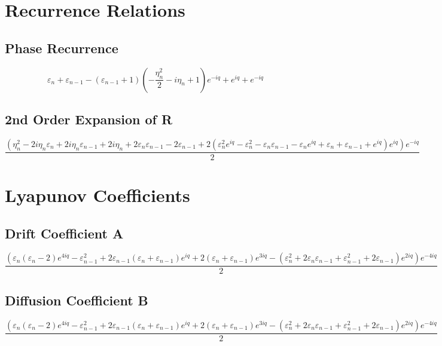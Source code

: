 
\section{Recurrence Relations}

\subsection{Phase Recurrence}
\begin{equation}
    \varepsilon_{n} + \varepsilon_{n-1} - \left(\varepsilon_{n-1} + 1\right) \left(- \frac{\eta_{n}^{2}}{2} - i \eta_{n} + 1\right) e^{- i q} + e^{i q} + e^{- i q}
    \label{eq:recurrence_r_ref}
\end{equation}

\subsection{2nd Order Expansion of R}
\begin{equation}
    \frac{\left(\eta_{n}^{2} - 2 i \eta_{n} \varepsilon_{n} + 2 i \eta_{n} \varepsilon_{n-1} + 2 i \eta_{n} + 2 \varepsilon_{n} \varepsilon_{n-1} - 2 \varepsilon_{n-1} + 2 \left(\varepsilon_{n}^{2} e^{i q} - \varepsilon_{n}^{2} - \varepsilon_{n} \varepsilon_{n-1} - \varepsilon_{n} e^{i q} + \varepsilon_{n} + \varepsilon_{n-1} + e^{i q}\right) e^{i q}\right) e^{- i q}}{2}
\end{equation}

\section{Lyapunov Coefficients}

\subsection{Drift Coefficient A}
\begin{equation}
    \frac{\left(\varepsilon_{n} \left(\varepsilon_{n} - 2\right) e^{4 i q} - \varepsilon_{n-1}^{2} + 2 \varepsilon_{n-1} \left(\varepsilon_{n} + \varepsilon_{n-1}\right) e^{i q} + 2 \left(\varepsilon_{n} + \varepsilon_{n-1}\right) e^{3 i q} - \left(\varepsilon_{n}^{2} + 2 \varepsilon_{n} \varepsilon_{n-1} + \varepsilon_{n-1}^{2} + 2 \varepsilon_{n-1}\right) e^{2 i q}\right) e^{- 4 i q}}{2}
\end{equation}

\subsection{Diffusion Coefficient B}
\begin{equation}
    \frac{\left(\varepsilon_{n} \left(\varepsilon_{n} - 2\right) e^{4 i q} - \varepsilon_{n-1}^{2} + 2 \varepsilon_{n-1} \left(\varepsilon_{n} + \varepsilon_{n-1}\right) e^{i q} + 2 \left(\varepsilon_{n} + \varepsilon_{n-1}\right) e^{3 i q} - \left(\varepsilon_{n}^{2} + 2 \varepsilon_{n} \varepsilon_{n-1} + \varepsilon_{n-1}^{2} + 2 \varepsilon_{n-1}\right) e^{2 i q}\right) e^{- 4 i q}}{2}
\end{equation}
